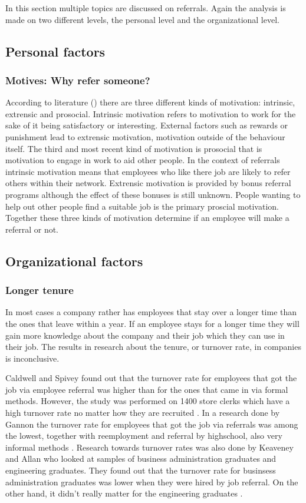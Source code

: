 \documentclass[Main.tex]{subfiles}
\begin{document}
In this section multiple topics are discussed on referrals. Again the analysis is made on two different levels, the personal level and the organizational level. 

\subsection*{Personal factors}


\subsubsection*{Motives: Why refer someone?}

According to literature (\cite{motives}) there are three different kinds of motivation: intrinsic, extrensic and prosocial. Intrinsic motivation refers to motivation to work for the sake of it being satisfactory or interesting. External factors such as rewards or punishment lead to extrensic motivation, motivation outside of the behaviour itself. The third and most recent kind of motivation is prosocial that is motivation to engage in work to aid other people. In the context of referrals intrinsic motivation means that employees who like there job are likely to refer others within their network. Extrensic motivation is provided by bonus referral programs although the effect of these bonuses is still unknown. People wanting to help out other people find a suitable job is the primary proscial motivation. Together these three kinds of motivation determine if an employee will make a referral or not.


\subsection*{Organizational factors}

\subsubsection*{Longer tenure}
In most cases a company rather has employees that stay over a longer time than the ones that leave within a year. If an employee stays for a longer time they will gain more knowledge about the company and their job which they can use in their job. 
The results in research about the tenure, or turnover rate, in companies is inconclusive.

Caldwell and Spivey found out that the turnover rate for employees that got the job via employee referral was higher than for the ones that came in via formal methods. However, the study was performed on 1400 store clerks which have a high turnover rate no matter how they are recruited \cite{second}. In a research done by Gannon the turnover rate for employees that got the job via referrals was among the lowest, together with reemployment and referral by highschool, also very informal methods \cite{seventh}.
Research towards turnover rates was also done by Keaveney and Allan who looked at samples of business administration graduates and engineering graduates. They found out that the turnover rate for businsess administration graduates was lower when they were hired by job referral. On the other hand, it didn't really matter for the engineering graduates \cite{eleventh}.
\end{document}
